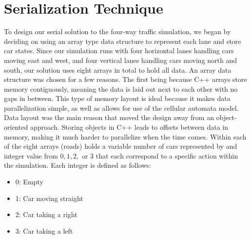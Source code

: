 \documentclass[conference]{IEEEtran}
\begin{document}
\section{Serialization Technique}
To design our serial solution to the four-way traffic simulation, we began by deciding on using an array type data structure to represent each lane and store car states. Since our simulation runs with four horizontal lanes handling cars moving east and west, and four vertical lanes handling cars moving north and south, our solution uses eight arrays in total to hold all data. An array data structure was chosen for a few reasons. The first being because C++ arrays store memory contiguously, meaning the data is laid out next to each other with no gaps in between. This type of memory layout is ideal because it makes data parallelization simple, as well as allows for use of the cellular automata model. Data layout was the main reason that moved the design away from an object-oriented approach. Storing objects in C++ leads to offsets between data in memory, making it much harder to parallelize when the time comes. Within each of the eight arrays (roads) holds a variable number of cars represented by and integer value from $0, 1, 2, $ or $3$ that each correspond to a specific action within the simulation. Each integer is defined as follows:\\ 

\begin{itemize}
	\item 0: Empty
	\item 1: Car moving straight
	\item 2: Car taking a right
	\item 3: Car taking a left \\
\end{itemize}
\end{document}
